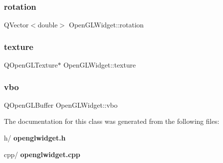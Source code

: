 \subsubsection{rotation}
{\footnotesize\ttfamily Q\+Vector$<$double$>$ Open\+G\+L\+Widget\+::rotation\hspace{0.3cm}{\ttfamily [private]}}

\mbox{\label{class_open_g_l_widget_afb76f6d9354bb49993c10e6fb6da7349}} 
\subsubsection{texture}
{\footnotesize\ttfamily Q\+Open\+G\+L\+Texture$\ast$ Open\+G\+L\+Widget\+::texture\hspace{0.3cm}{\ttfamily [private]}}

\mbox{\label{class_open_g_l_widget_a4b64b78f67c6da7e90cae7a4b34b5dce}} 
\subsubsection{vbo}
{\footnotesize\ttfamily Q\+Open\+G\+L\+Buffer Open\+G\+L\+Widget\+::vbo\hspace{0.3cm}{\ttfamily [private]}}



The documentation for this class was generated from the following files\+:\begin{DoxyCompactItemize}
\item 
h/\textbf{ openglwidget.\+h}\item 
cpp/\textbf{ openglwidget.\+cpp}\end{DoxyCompactItemize}
